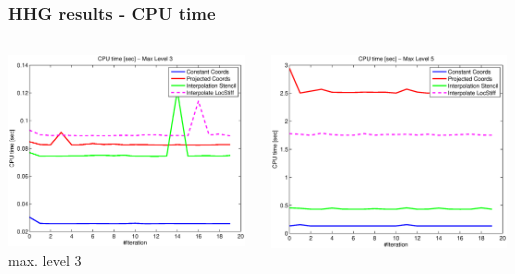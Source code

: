 \documentclass[t,compress=false,usepdftitle=false]{beamer}
\begin{document}
\begin{frame}\frametitle{HHG results - CPU time}

\begin{columns}[T] 
\begin{column}[T]{4.3cm} 
  \centering
  \includegraphics[width=0.98\textwidth]{spherepoisson_cpuTime_level3}\\
  max. level 3
\end{column}\hfill
\begin{column}[T]{4.3cm} 
  \centering
  \includegraphics[width=0.98\textwidth]{spherepoisson_cpuTime_level5}\\

\end{column}
\end{columns}
\end{frame}
\end{document}
